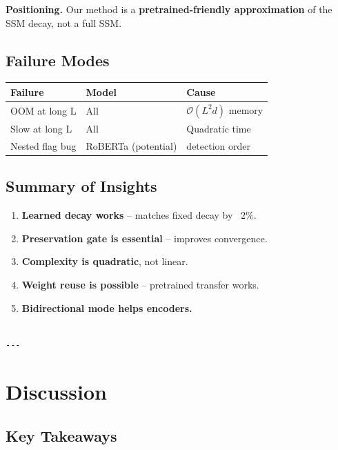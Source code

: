 \textbf{Positioning.} Our method is a \textbf{pretrained-friendly approximation} of 
the SSM decay, not a full SSM.

\subsection{Failure Modes}

\begin{table}[H]
\centering
\small
\begin{tabular}{lll}
\toprule
\textbf{Failure} & \textbf{Model} & \textbf{Cause} \\
\midrule
OOM at long L & All & $\mathcal{O}(L^2 d)$ memory \\
Slow at long L & All & Quadratic time \\
Nested flag bug & RoBERTa (potential) & detection order \\
\bottomrule
\end{tabular}
\end{table}

\subsection{Summary of Insights}

\begin{enumerate}
\item \textbf{Learned decay works} -- matches fixed decay by ~2\%.
\item \textbf{Preservation gate is essential} -- improves convergence.
\item \textbf{Complexity is quadratic}, not linear.
\item \textbf{Weight reuse is possible} -- pretrained transfer works.
\item \textbf{Bidirectional mode helps encoders.}
\end{enumerate}
\begin{lstlisting}

---
\end{lstlisting}

\section{Discussion}

\subsection{Key Takeaways}

